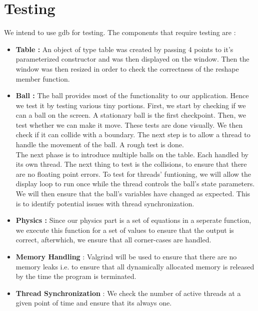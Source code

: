 \documentclass[]{article}
\begin{document}
\section{Testing}
We intend to use gdb for testing. The components that require testing are :
\begin{itemize}


\item \textbf{Table :}
An object of type table was created by passing 4 points to it's parameterized constructor and was then displayed on the window. Then the window was then resized in order to check the correctness of the reshape member function.
\item \textbf{Ball :}
The ball provides most of the functionality to our application. Hence we test it by testing various tiny portions.
First, we start by checking if we can a ball on the screen. A stationary ball is the first checkpoint. Then, we test whether we can make it move. These tests are done visually. We then check if it can collide with a boundary. The next step is to allow a thread to handle the movement of the ball. A rough test is done. \\
The next phase is to introduce multiple balls on the table. Each handled by its own thread. The next thing to test is the collisions, to ensure that there are no floating point errors.
To test for threads' funtioning, we will allow the display loop to run once while the thread controls the ball's state parameters. We will then ensure that the ball's variables have changed as expected. This is to identify potential issues with thread synchronization.
\item \textbf{Physics :} Since our physics part is a set of equations in a seperate function, we execute this function for a set of values to ensure that the output is correct, afterwhich, we ensure that all corner-cases are handled.
\item \textbf{Memory Handling} : Valgrind will be used to ensure that there are no memory leaks i.e. to ensure that all dynamically allocated memory is released by the time the program is terminated.
\item \textbf{Thread Synchronization} : We check the number of active threads at a given point of time and ensure that its always one.

\end{itemize}
\end{document}

